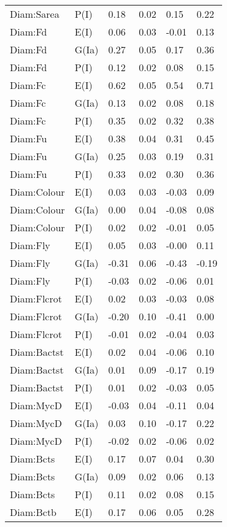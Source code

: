 \begin{center}
\begin{longtable}{|p{1.1in}|p{0.7in}|p{0.7in}|p{0.6in}|p{0.6in}|p{0.6in}|}
  Diam:Sarea & P(I) & 0.18 & 0.02 & 0.15 & 0.22 \\ 
  Diam:Fd & E(I) & 0.06 & 0.03 & -0.01 & 0.13 \\ 
  Diam:Fd & G(Ia) & 0.27 & 0.05 & 0.17 & 0.36 \\ 
  Diam:Fd & P(I) & 0.12 & 0.02 & 0.08 & 0.15 \\ 
  Diam:Fc & E(I) & 0.62 & 0.05 & 0.54 & 0.71 \\ 
  Diam:Fc & G(Ia) & 0.13 & 0.02 & 0.08 & 0.18 \\ 
  Diam:Fc & P(I) & 0.35 & 0.02 & 0.32 & 0.38 \\ 
  Diam:Fu & E(I) & 0.38 & 0.04 & 0.31 & 0.45 \\ 
  Diam:Fu & G(Ia) & 0.25 & 0.03 & 0.19 & 0.31 \\ 
  Diam:Fu & P(I) & 0.33 & 0.02 & 0.30 & 0.36 \\ 
  Diam:Colour & E(I) & 0.03 & 0.03 & -0.03 & 0.09 \\ 
  Diam:Colour & G(Ia) & 0.00 & 0.04 & -0.08 & 0.08 \\ 
  Diam:Colour & P(I) & 0.02 & 0.02 & -0.01 & 0.05 \\ 
  Diam:Fly & E(I) & 0.05 & 0.03 & -0.00 & 0.11 \\ 
  Diam:Fly & G(Ia) & -0.31 & 0.06 & -0.43 & -0.19 \\ 
  Diam:Fly & P(I) & -0.03 & 0.02 & -0.06 & 0.01 \\ 
  Diam:Flcrot & E(I) & 0.02 & 0.03 & -0.03 & 0.08 \\ 
  Diam:Flcrot & G(Ia) & -0.20 & 0.10 & -0.41 & 0.00 \\ 
  Diam:Flcrot & P(I) & -0.01 & 0.02 & -0.04 & 0.03 \\ 
  Diam:Bactst & E(I) & 0.02 & 0.04 & -0.06 & 0.10 \\ 
  Diam:Bactst & G(Ia) & 0.01 & 0.09 & -0.17 & 0.19 \\ 
  Diam:Bactst & P(I) & 0.01 & 0.02 & -0.03 & 0.05 \\ 
  Diam:MycD & E(I) & -0.03 & 0.04 & -0.11 & 0.04 \\ 
  Diam:MycD & G(Ia) & 0.03 & 0.10 & -0.17 & 0.22 \\ 
  Diam:MycD & P(I) & -0.02 & 0.02 & -0.06 & 0.02 \\ 
  Diam:Bcts & E(I) & 0.17 & 0.07 & 0.04 & 0.30 \\ 
  Diam:Bcts & G(Ia) & 0.09 & 0.02 & 0.06 & 0.13 \\ 
  Diam:Bcts & P(I) & 0.11 & 0.02 & 0.08 & 0.15 \\ 
  Diam:Bctb & E(I) & 0.17 & 0.06 & 0.05 & 0.28 \\ 

\end{longtable}
\end{center}
